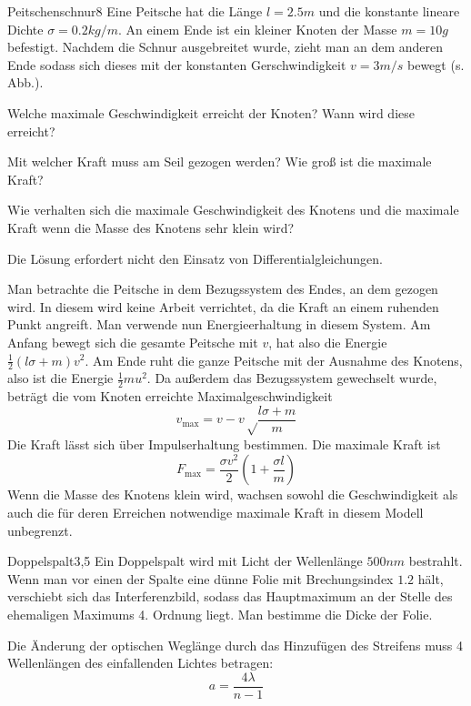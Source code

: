 \begin{problem}{Peitschenschnur}{8}
Eine Peitsche hat die Länge $l=2.5 \unit{m}$ und die konstante lineare Dichte $\sigma = 0.2 \unit{kg/m}$. An einem Ende ist ein kleiner Knoten der Masse $m = 10 \unit{g}$ befestigt. Nachdem die Schnur ausgebreitet wurde, zieht man an dem anderen Ende sodass sich dieses mit der konstanten Gerschwindigkeit $v = 3 \unit{m/s}$ bewegt (s. Abb.).
\begin{abcenum}
\item Welche maximale Geschwindigkeit erreicht der Knoten? Wann wird diese erreicht?
\item Mit welcher Kraft muss am Seil gezogen werden? Wie groß ist die maximale Kraft?
\item Wie verhalten sich die maximale Geschwindigkeit des Knotens und die maximale Kraft wenn die Masse des Knotens sehr klein wird?
\end{abcenum}
\hinweis Die Lösung erfordert nicht den Einsatz von Differentialgleichungen.
\begin{solution}
Man betrachte die Peitsche in dem Bezugssystem des Endes, an dem gezogen wird. In diesem wird keine Arbeit verrichtet, da die Kraft an einem ruhenden Punkt angreift. Man verwende nun Energieerhaltung in diesem System. Am Anfang bewegt sich die gesamte Peitsche mit $v$, hat also die Energie $\frac12 (l\sigma +m) v^2$. Am Ende ruht die ganze Peitsche mit der Ausnahme des Knotens, also ist die Energie $\frac12 m u^2$. Da außerdem das Bezugssystem gewechselt wurde, beträgt die vom Knoten erreichte Maximalgeschwindigkeit
\[
v_\mathrm{max} = v - v \sqrt\frac{l\sigma+m}{m}
\]
Die Kraft lässt sich über Impulserhaltung bestimmen. Die maximale Kraft ist
\[
F_\mathrm{max} = \frac{\sigma v^2}{2} \left( 1 + \frac{\sigma l}{m} \right)
\]
Wenn die Masse des Knotens klein wird, wachsen sowohl die Geschwindigkeit als auch die für deren Erreichen notwendige maximale Kraft in diesem Modell unbegrenzt.
\end{solution}
\end{problem}


\begin{problem}{Doppelspalt}{3,5}
Ein Doppelspalt wird mit Licht der Wellenlänge $500 \unit{nm}$ bestrahlt. Wenn man vor einen der Spalte eine dünne Folie mit Brechungsindex $1.2$ hält, verschiebt sich das Interferenzbild, sodass das Hauptmaximum an der Stelle des ehemaligen Maximums 4. Ordnung liegt. Man bestimme die Dicke der Folie.
\begin{solution}
Die Änderung der optischen Weglänge durch das Hinzufügen des Streifens muss 4 Wellenlängen des einfallenden Lichtes betragen:
\[
a= \frac{4 \lambda}{n-1}
\]
\end{solution}
\end{problem}

